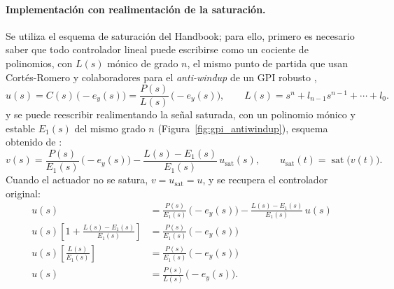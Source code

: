 \paragraph{Implementación con realimentación de la saturación.} Se utiliza el esquema de saturación del Handbook; para ello, primero 
es necesario saber que todo
controlador lineal puede escribirse como un cociente de polinomios, con $L(s)$
mónico de grado $n$, el mismo punto de partida que usan
Cortés-Romero y colaboradores para el \emph{anti-windup} de un GPI robusto
\cite{vargas2026microgrids}, 
\begin{equation}
u(s) = C(s)\,\bigl(-e_y(s)\bigr) = \frac{P(s)}{L(s)}\,\bigl(-e_y(s)\bigr),
\qquad L(s) = s^{n} + l_{n-1}s^{n-1} + \cdots + l_0 .
\end{equation}
y se puede reescribir realimentando la señal saturada, con un polinomio mónico y estable
$E_1(s)$ del mismo grado $n$ (Figura~\ref{fig:gpi_antiwindup}), esquema obtenido de
\cite[sec.~19.1.3]{levine2011handbook}:
\begin{equation}
v(s) = \frac{P(s)}{E_1(s)}\,\bigl(-e_y(s)\bigr) - \frac{L(s) - E_1(s)}{E_1(s)}\,u_{\mathrm{sat}}(s),
\qquad u_{\mathrm{sat}}(t) = \operatorname{sat}\bigl(v(t)\bigr) .
\label{eq:aw_handbook}
\end{equation}
Cuando el actuador no se satura, $v = u_{\mathrm{sat}} = u$, y se recupera el
controlador original:
\begin{align}
u(s) &= \frac{P(s)}{E_1(s)}\,\bigl(-e_y(s)\bigr) - \frac{L(s) - E_1(s)}{E_1(s)}\,u(s) \nonumber\\[4pt]
u(s)\left[1 + \frac{L(s) - E_1(s)}{E_1(s)}\right] &= \frac{P(s)}{E_1(s)}\,\bigl(-e_y(s)\bigr) \nonumber\\[4pt]
u(s)\left[\frac{L(s)}{E_1(s)}\right] &= \frac{P(s)}{E_1(s)}\,\bigl(-e_y(s)\bigr) \nonumber\\[4pt]
u(s) &= \frac{P(s)}{L(s)}\,\bigl(-e_y(s)\bigr) .
\end{align}



